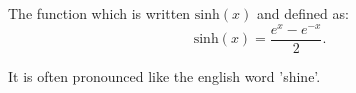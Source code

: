 The function which is written $\mathrm{sinh}(x)$ and defined as:
\[ \mathrm{sinh}(x) = \frac{e^x - e^{-x}}{2}. \]

It is often pronounced like the english word 'shine'.
  
  